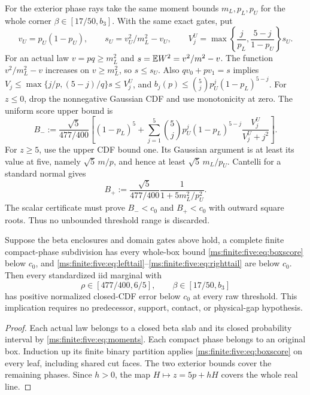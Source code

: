 For the exterior phase rays take the same moment bounds $m_L,p_L,p_U$
for the whole corner $\beta\in[17/50,b_3]$. With the same exact gates,
put
\[
 v_U=p_U(1-p_U),\qquad s_U=v_U^2/m_L^2-v_U,\qquad
 V_j^U=\max\left\{\frac j{p_L},\frac{5-j}{1-p_U}\right\}s_U.
\]
For an actual law $v=pq\ge m_L^2$ and
$s=\mathbb E W^2=v^2/m^2-v$. The function $v^2/m_L^2-v$ increases on
$v\ge m_L^2$, so $s\le s_U$. Also $qv_0+pv_1=s$ implies
$V_j\le\max\{j/p,(5-j)/q\}s\le V_j^U$, and
$b_j(p)\le\binom5j p_U^j(1-p_L)^{5-j}$.
For $z\le0$, drop the nonnegative Gaussian CDF and use monotonicity
at zero. The uniform score upper bound is
\begin{equation}\label{ms:finite:five:eq:lefttail}
 B_-:=\frac{\sqrt5}{477/400}
 \left[(1-p_L)^5+\sum_{j=1}^5\binom5j p_U^j(1-p_L)^{5-j}
             \frac{V_j^U}{V_j^U+j^2}\right].
\end{equation}
For $z\ge5$, use the upper CDF bound one. Its Gaussian argument is
at least its value at five, namely $\sqrt5\,m/p$, and hence at least
$\sqrt5\,m_L/p_U$. Cantelli for a standard normal gives
\begin{equation}\label{ms:finite:five:eq:righttail}
 B_+:=\frac{\sqrt5}{477/400}\frac1{1+5m_L^2/p_U^2}.
\end{equation}
The scalar certificate must prove $B_-<c_0$ and $B_+<c_0$ with
outward square roots. Thus no unbounded threshold range is discarded.

\begin{proposition}
\label{ms:finite:five:prop:gapfree}
Suppose the beta enclosures and domain gates above hold, a complete
finite compact-phase subdivision has every whole-box bound
\eqref{ms:finite:five:eq:boxscore} below $c_0$, and
\eqref{ms:finite:five:eq:lefttail}--\eqref{ms:finite:five:eq:righttail} are below $c_0$.
Then every standardized iid marginal with
\[
 \rho\in[477/400,6/5],\qquad\beta\in[17/50,b_3]
\]
has positive normalized closed-CDF error below $c_0$ at every raw
threshold. This implication requires no predecessor, support, contact,
or physical-gap hypothesis.
\end{proposition}
\begin{proof}
Each actual law belongs to a closed beta slab and its closed probability
interval by \eqref{ms:finite:five:eq:moments}. Each compact phase belongs to an
original box. Induction up its finite binary partition applies
\eqref{ms:finite:five:eq:boxscore} on every leaf, including shared cut faces.
The two exterior bounds cover the remaining phases. Since
$h>0$, the map $H\mapsto z=5p+hH$ covers the whole real line.
\end{proof}

